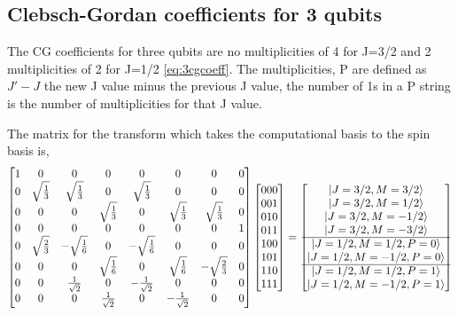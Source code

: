 \subsection{Clebsch-Gordan coefficients for 3 qubits}

The CG coefficients for three qubits are no multiplicities of 4 for J=3/2 and 2 multiplicities of 2 for J=1/2  \autoref{eq:3cgcoeff}. The multiplicities, P are defined as $J'-J$ the new J value minus the previous J value, the number of 1s in a P string is the number of multiplicities for that J value.


The matrix for the transform which takes the computational basis to the spin basis is,
\begin{align}
\begin{bmatrix}
1 &0 &0 &0 &0 &0 &0 &0 \\
0 &\sqrt{\frac{1}{3}} &\sqrt{\frac{1}{3}} &0 &\sqrt{\frac{1}{3}} &0 &0 &0\\
0 &0 &0 &\sqrt{\frac{1}{3}} &0 &\sqrt{\frac{1}{3}} &\sqrt{\frac{1}{3}} &0 \\
0 &0 &0 &0 &0 &0 &0 &1 \\
0 &\sqrt{\frac{2}{3}} &-\sqrt{\frac{1}{6}} &0 &-\sqrt{\frac{1}{6}} &0 &0 &0\\
0 &0 &0 &\sqrt{\frac{1}{6}} &0 &\sqrt{\frac{1}{6}} &-\sqrt{\frac{2}{3}} &0 \\
0 &0 &\frac{1}{\rtwo} &0 &-\frac{1}{\rtwo} &0 &0 &0 \\
0 &0 &0 &\frac{1}{\rtwo} &0 &-\frac{1}{\rtwo} &0 &0 \\
\end{bmatrix}
%
\begin{bmatrix}
000 \\
001 \\
010 \\
011 \\
100 \\
101 \\
110 \\
111 \\
\end{bmatrix}
=
\begin{bmatrix}
\ket{J=3/2, M=3/2} \\
\ket{J=3/2, M=1/2} \\
\ket{J=3/2, M=-1/2} \\
\ket{J=3/2, M=-3/2} \\ 
\hline
\ket{J=1/2, M=1/2, P=0} \\
\ket{J=1/2, M=-1/2, P=0} \\
\hline
\ket{J=1/2, M=1/2, P=1} \\
\ket{J=1/2, M=-1/2, P=1} \\ 
\end{bmatrix}
\label{eq:3qubitcg}
\end{align}

